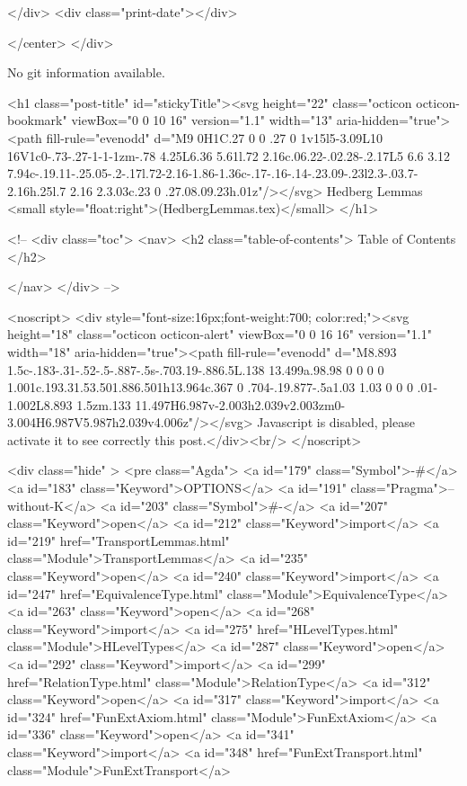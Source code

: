           
        </div>
        <div class="print-date"></div>
        
        
    </center>
  </div>

  
  No git information available.
  

  <h1 class="post-title" id="stickyTitle"><svg height="22" class="octicon octicon-bookmark" viewBox="0 0 10 16" version="1.1" width="13" aria-hidden="true"><path fill-rule="evenodd" d="M9 0H1C.27 0 0 .27 0 1v15l5-3.09L10 16V1c0-.73-.27-1-1-1zm-.78 4.25L6.36 5.61l.72 2.16c.06.22-.02.28-.2.17L5 6.6 3.12 7.94c-.19.11-.25.05-.2-.17l.72-2.16-1.86-1.36c-.17-.16-.14-.23.09-.23l2.3-.03.7-2.16h.25l.7 2.16 2.3.03c.23 0 .27.08.09.23h.01z"/></svg> Hedberg Lemmas <small style="float:right">(HedbergLemmas.tex)</small>
  </h1>

  <!-- 
  <div class="toc">
    <nav>
    <h2 class="table-of-contents"> Table of Contents </h2>
      

    </nav>
  </div>
   -->

  <noscript>
  <div style="font-size:16px;font-weight:700; color:red;"><svg height="18" class="octicon octicon-alert" viewBox="0 0 16 16" version="1.1" width="18" aria-hidden="true"><path fill-rule="evenodd" d="M8.893 1.5c-.183-.31-.52-.5-.887-.5s-.703.19-.886.5L.138 13.499a.98.98 0 0 0 0 1.001c.193.31.53.501.886.501h13.964c.367 0 .704-.19.877-.5a1.03 1.03 0 0 0 .01-1.002L8.893 1.5zm.133 11.497H6.987v-2.003h2.039v2.003zm0-3.004H6.987V5.987h2.039v4.006z"/></svg> Javascript is disabled, please activate it to see correctly this post.</div><br/>
  </noscript>

  <div class="hide" >
<pre class="Agda">
<a id="179" class="Symbol">{-#</a> <a id="183" class="Keyword">OPTIONS</a> <a id="191" class="Pragma">--without-K</a> <a id="203" class="Symbol">#-}</a>
<a id="207" class="Keyword">open</a> <a id="212" class="Keyword">import</a> <a id="219" href="TransportLemmas.html" class="Module">TransportLemmas</a>
<a id="235" class="Keyword">open</a> <a id="240" class="Keyword">import</a> <a id="247" href="EquivalenceType.html" class="Module">EquivalenceType</a>
<a id="263" class="Keyword">open</a> <a id="268" class="Keyword">import</a> <a id="275" href="HLevelTypes.html" class="Module">HLevelTypes</a>
<a id="287" class="Keyword">open</a> <a id="292" class="Keyword">import</a> <a id="299" href="RelationType.html" class="Module">RelationType</a>
<a id="312" class="Keyword">open</a> <a id="317" class="Keyword">import</a> <a id="324" href="FunExtAxiom.html" class="Module">FunExtAxiom</a>
<a id="336" class="Keyword">open</a> <a id="341" class="Keyword">import</a> <a id="348" href="FunExtTransport.html" class="Module">FunExtTransport</a>


